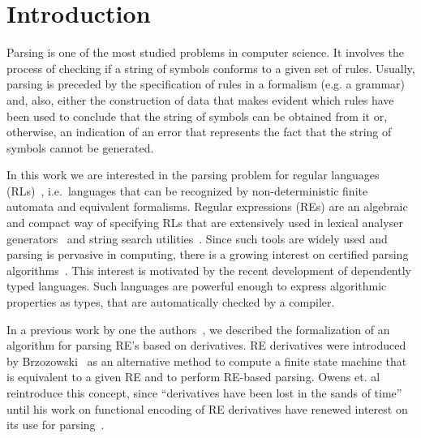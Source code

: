\documentclass[sigconf]{acmart}
\theoremstyle{definition}
\begin{document}



\maketitle


\section{Introduction}\label{sec:intro}

Parsing is one of the most studied problems in computer science. 
It involves the process of checking if a string of symbols conforms to
a given set of rules. Usually, parsing is preceded by the 
specification of rules in a formalism (e.g. a grammar) and, also, either the
construction of data that makes evident which rules have been used to
conclude that the string of symbols can be obtained from it or, otherwise,
an indication of an error that represents the
fact that the string of symbols cannot be generated.

In this work we are interested in the parsing problem for regular
languages (RLs)~\cite{Hopcroft2000}, i.e.~languages that can be
recognized by non-deterministic finite automata and equivalent
formalisms. Regular expressions (REs) are an algebraic and compact way
of specifying RLs that are extensively used in lexical analyser
generators~\cite{Lesk1990} and string search utilities~\cite{Grep}.
Since such tools are widely used and parsing is pervasive in
computing, there is a growing interest on certified parsing
algorithms~\cite{FirsovU13,FirsovU14,Danielsson2010}.  
This interest is motivated by the recent development of dependently typed
languages. Such languages are powerful enough to express algorithmic
properties as types, that are automatically checked by a compiler.

In a previous work by one the authors~\cite{Lopes2016}, we described
the formalization of an algorithm for parsing RE's based on 
derivatives. RE derivatives were introduced by
Brzozowski~\cite{Brzozowski1964} as an alternative method to compute a
finite state machine that is equivalent to a given RE and to perform
RE-based parsing. Owens et. al~\cite{Owens2009} reintroduce this concept,
since ``derivatives have been lost in the sands of time'' until his work on
functional encoding of RE derivatives have renewed interest on its use
for parsing~\cite{Might2011,Fischer2010}. 
\end{document}
